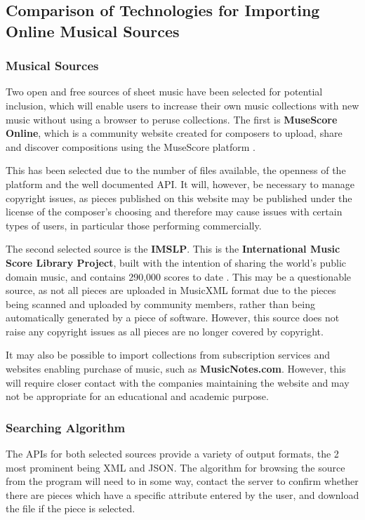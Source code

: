 \subsection{Comparison of Technologies for Importing Online Musical Sources}
\subsubsection{Musical Sources}
Two open and free sources of sheet music have been selected for potential inclusion, which will enable users to increase their own music collections with new music without using a browser to peruse collections. The first is \textbf{MuseScore Online}, which is a community website created for composers to upload, share and discover compositions using the MuseScore platform \parencite{MuseShare}.

This has been selected due to the number of files available, the openness of the platform and the well documented API. It will, however, be necessary to manage copyright issues, as pieces published on this website may be published under the license of the composer's choosing and therefore may cause issues with certain types of users, in particular those performing commercially.

The second selected source is the \textbf{IMSLP}. This is the \textbf{International Music Score Library Project}, built with the intention of sharing the world’s public domain music, and contains 290,000 scores to date \parencite{imslp}. This may be a questionable source, as not all pieces are uploaded in MusicXML format due to the pieces being scanned and uploaded by community members, rather than being automatically generated by a piece of software. However, this source does not raise any copyright issues as all pieces are no longer covered by copyright.

It may also be possible to import collections from subscription services and websites enabling purchase of music, such as \textbf{MusicNotes.com}. However, this will require closer contact with the companies maintaining the website and may not be appropriate for an educational and academic purpose.

\subsubsection{Searching Algorithm}
The APIs for both selected sources provide a variety of output formats, the 2 most prominent being XML and JSON. The algorithm for browsing the source from the program will need to in some way, contact the server to confirm whether there are pieces which have a specific attribute entered by the user, and download the file if the piece is selected.

